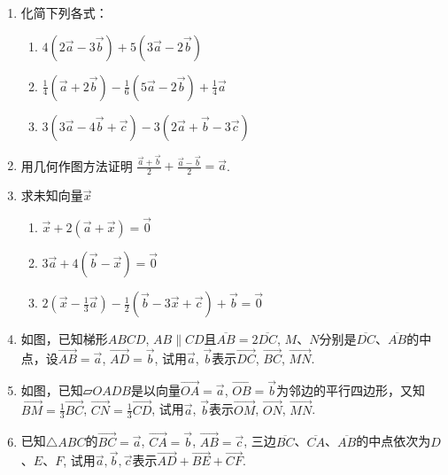 \begin{ex}
\begin{enumerate}
    \item 化简下列各式：
\begin{enumerate}
    \item $4\left(2\vec{a}-3\vec{b}\right)+5\left(3\vec{a}-2\vec{b}\right)$
    \item $\frac{1}{4}\left(\vec{a}+2\vec{b}\right)-\frac{1}{6}\left(5\vec{a}-2\vec{b}\right)+\frac{1}{4}\vec{a}$
    \item $3\left(3\vec{a}-4\vec{b}+\vec{c}\right)-3\left(2\vec{a}+\vec{b}-3\vec{c}\right)$
\end{enumerate}
\item 用几何作图方法证明
$\frac{\vec{a}+\vec{b}}{2}+\frac{\vec{a}-\vec{b}}{2}=\vec{a}$.
\item 求未知向量$\vec{x}$
\begin{enumerate}
    \item $\vec{x}+2\left(\vec{a}+\vec{x}\right)=\vec{0}$
    \item $3\vec{a}+4\left(\vec{b}-\vec{x}\right)=\vec{0}$
    \item $2\left(\vec{x}-\frac{1}{3}\vec{a}\right)-\frac{1}{2}\left(\vec{b}-3\vec{x}+\vec{c}\right)+\vec{b}=\vec{0}$
\end{enumerate}
\item 如图，已知梯形$ABCD$, $AB\parallel CD$且$\overline{AB}=2\overline{DC}$, $M$、$N$分别是$\overline{DC}$、$\overline{AB}$的中点，设$\Vec{AB}=\vec{a}$, $\Vec{AD}=\vec{b}$, 试用$\vec{a}$, $\vec{b}$表示$\Vec{DC}$, $\Vec{BC}$, $\Vec{MN}$.
\item 如图，已知$\parallelogram OADB$是以向量$\Vec{OA}=\vec{a}$, $\Vec{OB}=\vec{b}$为邻边的平行四边形，又知$\Vec{BM}=\frac{1}{3}\Vec{BC}$, $\Vec{CN}=\frac{1}{3}\Vec{CD}$, 试用$\vec{a}$, $\vec{b}$表示$\Vec{OM}$, $\Vec{ON}$, $\Vec{MN}$.
\item 已知$\triangle ABC$的$\Vec{BC}=\vec{a}$, $\Vec{CA}=\vec{b}$, $\Vec{AB}=\vec{c}$, 三边$\overline{BC}$、$\overline{CA}$、$\overline{AB}$的中点依次为$D$、$E$、$F$, 试用$\vec{a},\vec{b},\vec{c}$表示$\Vec{AD}+\Vec{BE}+\Vec{CF}$.
\end{enumerate}
\end{ex}

